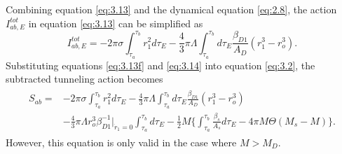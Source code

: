 \documentclass[12pt]{article}
\begin{document}
Combining equation \eqref{eq:3.13} and the dynamical equation \eqref{eq:2.8}, the action $I^{tot}_{ab,E}$ in equation \eqref{eq:3.13} can be simplified as
\begin{equation}
\label{eq:3.14}%
I^{tot}_{ab,E}=-2\pi\sigma \int_{\tau_{a}}^{\tau_{b}}r_{1}^{2}d\tau_{E}-\frac{4}{3}\pi\Lambda\int_{\tau_{a}}^{\tau_{b}}d\tau_{E}\frac{\beta_{D1}}{A_{D}}(r_{1}^{3}-r_{o}^{3}).
\end{equation}
Substituting equations \eqref{eq:3.13f} and \eqref{eq:3.14} into equation \eqref{eq:3.2}, the subtracted tunneling action becomes
\begin{eqnarray}\begin{split}
\label{eq:3.14b}%
S_{ab}= &-2\pi\sigma \int_{\tau_{a}}^{\tau_{b}}r_{1}^{2}d\tau_{E}-\frac{4}{3}\pi\Lambda\int_{\tau_{a}}^{\tau_{b}}d\tau_{E}\frac{\beta_{D1}}{A_{D}}(r_{1}^{3}-r_{o}^{3})\\&-\frac{4}{3}\pi\Lambda r_{o}^{3}\beta_{D1}^{-1}\Big|_{\dot{r}_{1}=0}\int_{\tau_{a}}^{\tau_{b}}d\tau_{E}-\frac{1}{2}M\big\{\int_{\tau_{a}}^{\tau_{b}}\frac{\beta_{s}}{A_{s}}d\tau_{E}-4\pi M\Theta(M_{s}-M)\big\}.
\end{split}
\end{eqnarray}
However, this equation is only valid in the case where $M>M_{D}$.
\end{document}

